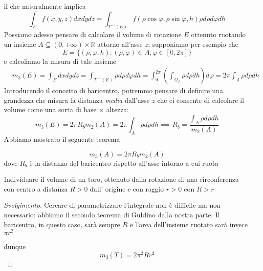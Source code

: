 il che naturalmente implica
$$
\int_E f(x, y, z)dxdydz = \int_{T^{-1}(E)} f(\rho \cos{\varphi}, \rho \sin{\varphi}, h) \rho d\rho d\varphi dh
$$
Possiamo adesso pensare di calcolare il volume di rotazione $E$ ottenuto ruotando un insieme $A \subseteq (0, +\infty) \times \mathbb{R}$ attorno all'asse $z$: supponiamo per esempio che
$$
E = \{(\rho, \varphi, h) : (\rho, \varphi) \in A, \varphi \in [0, 2\pi] \}
$$
e calcoliamo la misura di tale insieme
\begin{align*}
&m_3(E) = \int_E dxdydz = \int_{T^{-1}(E)} \rho d\rho d\varphi dh = \int_0^{2\pi} \left( \int_{\Omega_\varphi} \rho d\rho dh \right) d\varphi = 2\pi \int_A \rho d\rho dh
\end{align*}
Introducendo il concetto di baricentro, potremmo pensare di definire una grandezza che misura la distanza \emph{media} dall'asse $z$ che ci consente di calcolare il volume come una sorta di base $\times$ altezza:
$$
m_3(E) = 2 \pi R_b m_2(A) = 2 \pi \int_A \rho d\rho dh \implies R_b = \frac{\int_A \rho d\rho dh}{m_2(A)}
$$
Abbiamo mostrato il seguente teorema
\begin{theorem}
	$$m_3(A) = 2 \pi R_b m_2(A) $$ dove $R_b$ è la distanza del baricentro rispetto all'asse intorno a cui ruota 
\end{theorem}
\begin{exercise}
Individuare il volume di un toro, ottenuto dalla rotazione di una circonferenza con centro a distanza $R > 0$ dall' origine e con raggio $r > 0$ con $R > r$
\end{exercise}
\begin{proof}[Svolgimento]
Cercare di parametrizzare l'integrale non è difficile ma non necessario: abbiamo il secondo teorema di Guldino dalla nostra parte. Il baricentro, in questo caso, sarà sempre $R$ e l'area dell'insieme ruotato sarà invece $\pi r^2$
\begin{figure}
	\centering
\end{figure}
dunque
$$
m_3(T) = 2\pi^2 Rr^2
$$
\end{proof}
